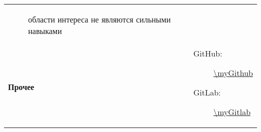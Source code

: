 \documentclass[../../main.tex]{subfiles}
\begin{document}
\begin{tabularx}{\textwidth}{>{\bfseries} p{3cm} X}
\begin{description}
                \item[\ii{Замечание:}] области интереса не являются сильными навыками
            \end{description}\\
        Прочее &
            \begin{description}
                \item[GitHub:] \url{\myGithub}
                \item[GitLab:] \url{\myGitlab}
            \end{description}\\
    \end{tabularx}
\end{document}
